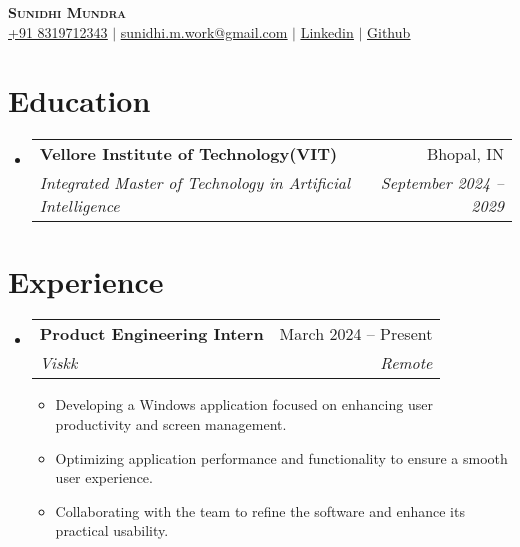 \documentclass[letterpaper,11pt]{article}
\makeatletter
\newcommand{\resumeItem}[1]{
  \item\small{
    {#1 \vspace{-2pt}}
  }
}
\newcommand{\resumeSubheading}[4]{
  \vspace{-2pt}\item
    \begin{tabular*}{0.97\textwidth}[t]{l@{\extracolsep{\fill}}r}
      \textbf{#1} & #2 \\
      \textit{\small#3} & \textit{\small #4} \\
    \end{tabular*}\vspace{-7pt}
}
\newcommand{\resumeSubHeadingListStart}{\begin{itemize}[leftmargin=0.15in, label={}]}
\newcommand{\resumeSubHeadingListEnd}{\end{itemize}}
\newcommand{\resumeItemListStart}{\begin{itemize}}
\newcommand{\resumeItemListEnd}{\end{itemize}\vspace{-5pt}}
\makeatother
\begin{document}
\begin{center}
    \textbf{\Huge \scshape Sunidhi Mundra} \\ \vspace{1pt}
    \href{tel:+918319712343}{\underline{+91 8319712343}} $|$ 
    \href{mailto:sunidhi.m.work@gmail.com}{\underline{sunidhi.m.work@gmail.com}} $|$ 
    \href{https://www.linkedin.com/in/sunidhi-mundra}{\underline{Linkedin}} $|$
    \href{https://github.com/foundsunidhi}{\underline{Github}}
\end{center}

\section{Education}
  \resumeSubHeadingListStart
    \resumeSubheading
      {Vellore Institute of Technology(VIT) }{Bhopal, IN}
      {Integrated Master of Technology in Artificial Intelligence}{September 2024 -- 2029}
  \resumeSubHeadingListEnd

\section{Experience}
  \resumeSubHeadingListStart
   \resumeSubheading
      {Product Engineering Intern}{March 2024 -- Present}
      {Viskk}{Remote}
      \resumeItemListStart
       \resumeItem{Developing a Windows application focused on enhancing user productivity and screen management.}
        \resumeItem{Optimizing application performance and functionality to ensure a smooth user experience.}
        \resumeItem{Collaborating with the team to refine the software and enhance its practical usability.}
      \resumeItemListEnd
  \resumeSubHeadingListEnd

\end{document}
